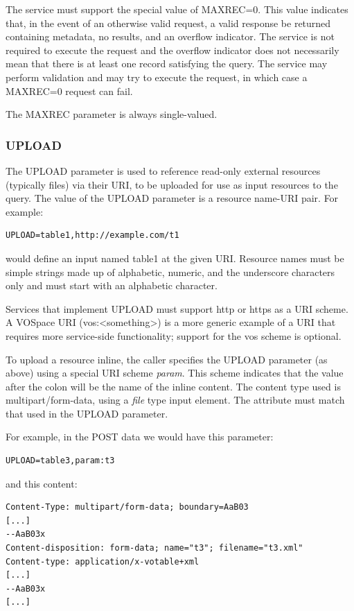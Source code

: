 \documentclass[11pt,letter]{ivoa}
\begin{document}
The service must support the special value of MAXREC=0. This value indicates
that, in the event of an otherwise valid request, a valid response be returned
containing metadata, no results, and an overflow indicator. The
service is not required to execute the request and the overflow indicator does
not necessarily mean that there is at least one record satisfying the query. The
service may perform validation and may try to execute the request, in which case
a MAXREC=0 request can fail.

The MAXREC parameter is always single-valued.

\subsubsection{UPLOAD}
\label{sec:UPLOAD}
The UPLOAD parameter is used to reference read-only external resources
(typically files) via their URI, to be uploaded for use as input resources to
the query. The value of the UPLOAD parameter is a resource name-URI pair. For
example:

\begin{verbatim}
UPLOAD=table1,http://example.com/t1
\end{verbatim}

\noindent
would define an input named table1 at the given URI. Resource names must be
simple strings made up of alphabetic, numeric, and the underscore characters
only and must start with an alphabetic character.

Services that implement UPLOAD must support http or https as a URI scheme.
A VOSpace URI (vos:<something>)  is a
more generic example of a URI that requires more service-side functionality;
support for the vos scheme is optional.

To upload a resource inline, the caller specifies the UPLOAD parameter (as
above) using a special URI scheme \emph{param}. This scheme indicates that the value
after the colon will be the name of the inline content. The content type used is
multipart/form-data, using a \emph{file} type input element. The  attribute
must match that used in the UPLOAD parameter.

For example, in the POST data we would have this parameter:

\begin{verbatim}
UPLOAD=table3,param:t3
\end{verbatim}

and this content:

\begin{verbatim}
Content-Type: multipart/form-data; boundary=AaB03
[...]
--AaB03x
Content-disposition: form-data; name="t3"; filename="t3.xml"
Content-type: application/x-votable+xml
[...]
--AaB03x
[...]
\end{verbatim}
\end{document}
